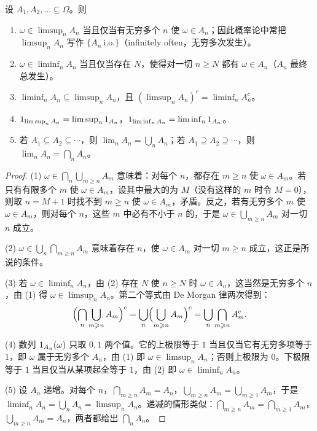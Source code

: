 \begin{proposition}\label{prop:set-systems:limsup}
设 $A_1,A_2,\dots\subseteq\Omega$。则
\begin{enumerate}
\item $\omega\in\limsup_nA_n$ 当且仅当有无穷多个 $n$ 使 $\omega\in A_n$；因此概率论中常把 $\limsup_nA_n$ 写作 $\{A_n\ \text{i.o.}\}$（infinitely often，无穷多次发生）。
\item $\omega\in\liminf_nA_n$ 当且仅当存在 $N$，使得对一切 $n\geqslant N$ 都有 $\omega\in A_n$（$A_n$ 最终总发生）。
\item $\liminf_nA_n\subseteq\limsup_nA_n$，且 $(\limsup_nA_n)^c=\liminf_nA_n^c$。
\item $1_{\limsup_nA_n}=\limsup_n1_{A_n}$，$1_{\liminf_nA_n}=\liminf_n1_{A_n}$。
\item 若 $A_1\subseteq A_2\subseteq\cdots$，则 $\lim_nA_n=\bigcup_nA_n$；若 $A_1\supseteq A_2\supseteq\cdots$，则 $\lim_nA_n=\bigcap_nA_n$。
\end{enumerate}
\end{proposition}
\begin{proof}
(1) $\omega\in\bigcap_n\bigcup_{m\geqslant n}A_m$ 意味着：对每个 $n$，都存在 $m\geqslant n$ 使 $\omega\in A_m$。若只有有限多个 $m$ 使 $\omega\in A_m$，设其中最大的为 $M$（没有这样的 $m$ 时令 $M=0$），则取 $n=M+1$ 时找不到 $m\geqslant n$ 使 $\omega\in A_m$，矛盾。反之，若有无穷多个 $m$ 使 $\omega\in A_m$，则对每个 $n$，这些 $m$ 中必有不小于 $n$ 的，于是 $\omega\in\bigcup_{m\geqslant n}A_m$ 对一切 $n$ 成立。

(2) $\omega\in\bigcup_n\bigcap_{m\geqslant n}A_m$ 意味着存在 $n$，使 $\omega\in A_m$ 对一切 $m\geqslant n$ 成立，这正是所说的条件。

(3) 若 $\omega\in\liminf_nA_n$，由 (2) 存在 $N$ 使 $n\geqslant N$ 时 $\omega\in A_n$，这当然是无穷多个 $n$，由 (1) 得 $\omega\in\limsup_nA_n$。第二个等式由 De Morgan 律两次得到：
\[
\Bigl(\bigcap_n\bigcup_{m\geqslant n}A_m\Bigr)^c=\bigcup_n\Bigl(\bigcup_{m\geqslant n}A_m\Bigr)^c=\bigcup_n\bigcap_{m\geqslant n}A_m^c .
\]

(4) 数列 $1_{A_n}(\omega)$ 只取 $0,1$ 两个值。它的上极限等于 $1$ 当且仅当它有无穷多项等于 $1$，即 $\omega$ 属于无穷多个 $A_n$，由 (1) 即 $\omega\in\limsup_nA_n$；否则上极限为 $0$。下极限等于 $1$ 当且仅当从某项起全等于 $1$，由 (2) 即 $\omega\in\liminf_nA_n$。

(5) 设 $A_n$ 递增。对每个 $n$，$\bigcap_{m\geqslant n}A_m=A_n$，$\bigcup_{m\geqslant n}A_m=\bigcup_{m\geqslant 1}A_m$，于是 $\liminf_nA_n=\bigcup_nA_n=\limsup_nA_n$。递减的情形类似：$\bigcap_{m\geqslant n}A_m=\bigcap_{m\geqslant1}A_m$，$\bigcup_{m\geqslant n}A_m=A_n$，两者都给出 $\bigcap_nA_n$。
\end{proof}

